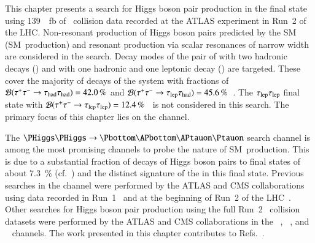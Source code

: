 This chapter presents a search for Higgs boson pair production in the \bbtautau
final state using \SI{139}{\per\femto\barn} of \pp~collision data recorded at
the ATLAS experiment in Run~2 of the LHC. Non-resonant production of Higgs
boson pairs predicted by the SM (SM~\HH production) and resonant production via
scalar resonances of narrow width are considered in the search. Decay modes of
the pair of \tauleptons with two hadronic \taulepton decays (\hadhad) and with
one hadronic and one leptonic \taulepton decay (\lephad) are targeted. These
cover the majority of decays of the \tautau system with fractions of
$\mathcal{B}(\tau^{+} \tau^{-} \to \tau_{\text{had}}\tau_{\text{had}}) = \SI{42.0}{\percent}$ and
$\mathcal{B}(\tau^{+} \tau^{-} \to \tau_{\text{lep}}\tau_{\text{had}}) =
\SI{45.6}{\percent}$~\cite{Zyla:2020zbs}. The $\tau_{\text{lep}}\tau_{\text{lep}}$ final state with
$\mathcal{B}(\tau^{+} \tau^{-} \to \tau_{\text{lep}}\tau_{\text{lep}}) =
\SI{12.4}{\percent}$~\cite{Zyla:2020zbs} is not considered in this search. The
primary focus of this chapter lies on the \hadhad channel.

The $\HH \to \bbtautau$ search channel is among the most promising channels to
probe the nature of SM~\HH production. This is due to a substantial fraction of
decays of Higgs boson pairs to \bbtautau final states of about
\SI{7.3}{\percent} (cf.~) and the distinct
signature of the \tauleptons in this final state. Previous searches in the
\bbtautau channel were performed by the ATLAS and CMS collaborations using data
recorded in Run~1~\cite{HIGG-2013-33,CMS-HIG-15-013} and at the beginning of
Run~2 of the LHC~\cite{HIGG-2016-16-witherratum,CMS-HIG-17-002}.  Other searches
for Higgs boson pair production using the full Run~2 \pp~collision datasets were
performed by the ATLAS and CMS collaborations in the
\bbtautau~\cite{CMS-PAS-HIG-20-010},
\bbbb~\cite{ATLAS-CONF-2022-035,CMS-HIG-20-005}, and
\bbyy~\cite{HDBS-2018-34,CMS-HIG-19-018} channels.
The work presented in this chapter contributes to
Refs.~\cite{ATLAS-CONF-2021-030,HDBS-2018-40}.

